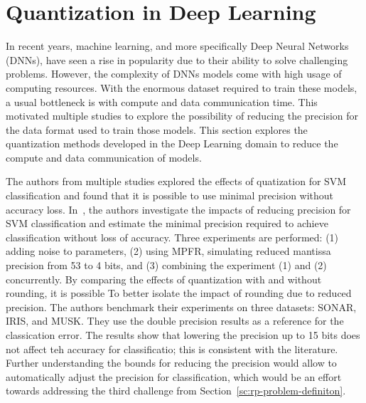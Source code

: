 \section{Quantization in Deep Learning }
In recent years, machine learning, and more specifically Deep Neural Networks (DNNs),
have seen a rise in popularity due to their ability to solve challenging problems.
However, the complexity of DNNs models come with high usage of computing resources.
With the enormous dataset required to train these models, a usual bottleneck is with compute and data communication time.
This motivated multiple studies \cite{Johnson2018-up,Wang2018-oo,Lesser2011-mn,Chen2018-an,Judd2015-kw,Vicuna2021-mw}
to explore the possibility of reducing the precision for the data format used to train those models.
This section explores the quantization methods developed in the Deep Learning 
domain to reduce the compute and data communication of models.

The authors from multiple studies explored the effects of quatization for SVM classification
and found that it is possible to use minimal precision without accuracy loss.
In~\cite{Lesser2011-mn}, the authors investigate the impacts of reducing precision for SVM
classification and estimate the minimal precision required to achieve classification 
without loss of accuracy. Three experiments are performed: 
(1) adding noise to parameters,
(2) using MPFR, simulating reduced mantissa precision from 53 to 4 bits,
and (3) combining the experiment (1) and (2) concurrently.
By comparing the effects of quantization with and without rounding, it is possible To
better isolate the impact of rounding due to reduced precision.
The authors benchmark their experiments on three datasets: SONAR, IRIS, and MUSK.
They use the double precision results as a reference for the classication error.
The results show that lowering the precision up to 15 bits does not affect teh accuracy
for classificatio; this is consistent with the literature.
Further understanding the bounds for reducing the precision would allow to automatically
adjust the precision for classification, which would be an effort towards addressing the third 
challenge from Section~\ref{sc:rp-problem-definiton}.

